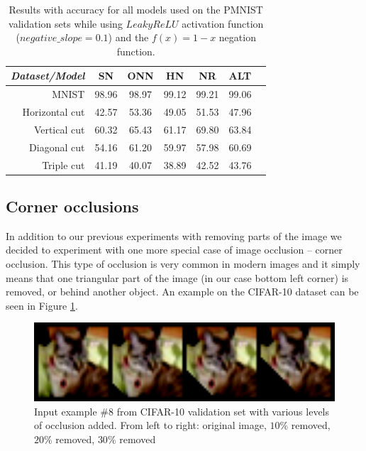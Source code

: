 \documentclass[b5paper]{book}
\begin{document}
\begin{table}[ht]
  \centering
  \begin{tabular}{rS[table-format=2.1]S[table-format=2.1]S[table-format=2.1]S[table-format=2.1]S[table-format=2.1]S[table-format=2.1]}
    \toprule
     \textit{Dataset/Model} & SN & ONN & HN & NR & ALT \\
    \midrule
    {MNIST} & {98.96} & {98.97} & {99.12} & {99.21} & {99.06} \\
    {Horizontal cut} & {42.57} & {53.36} & {49.05} & {51.53} & {47.96} \\
    {Vertical cut} & {60.32} & {65.43} & {61.17} & {69.80} & {63.84} \\
    {Diagonal cut} & {54.16} & {61.20} & {59.97} & {57.98} & {60.69} \\
    {Triple cut} & {41.19} & {40.07} & {38.89} & {42.52} & {43.76} \\
    
    \bottomrule
  \end{tabular}
  \caption{Results with accuracy for all models used on the PMNIST validation sets while using \( LeakyReLU \) activation function (\( negative\_slope = 0.1\)) and the \( f(x) = 1 - x \) negation function.}
  \label{tab:results-leakyrelu}
\end{table} 

\subsection{Corner occlusions}

In addition to our previous experiments with removing parts of the image we decided to experiment with one more special case of image occlusion -- corner occlusion. This type of occlusion is very common in modern images and it simply means that one triangular part of the image (in our case bottom left corner) is removed, or behind another object. An example on the CIFAR-10 dataset can be seen in Figure \ref{fig:cbomf3}.

\begin{figure}
    \centering
    \includegraphics[width=1\textwidth]{figures/fig3.png}
\caption{Input example \#8 from CIFAR-10 validation set with various levels of occlusion added. From left to right: original image, \( 10\% \) removed, \( 20\% \) removed, \( 30\% \) removed}
\label{fig:cbomf3} 
\end{figure}
\end{document}
